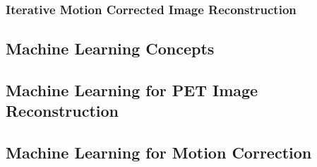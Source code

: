             \subsubsection{Iterative Motion Corrected Image Reconstruction} \label{iterative_motion_corrected_image_reconstruction}
                \blindtext
    
        \blindtext
        
        \subsection{Machine Learning Concepts} \label{machine_learning_concepts}
            \blindtext
        
        \subsection{Machine Learning for PET Image Reconstruction} \label{machine_learning_for_pet_image_reconstruction}
            \blindtext
        
        \subsection{Machine Learning for Motion Correction} \label{machine_learning_for_motion_correction}
            \blindtext
